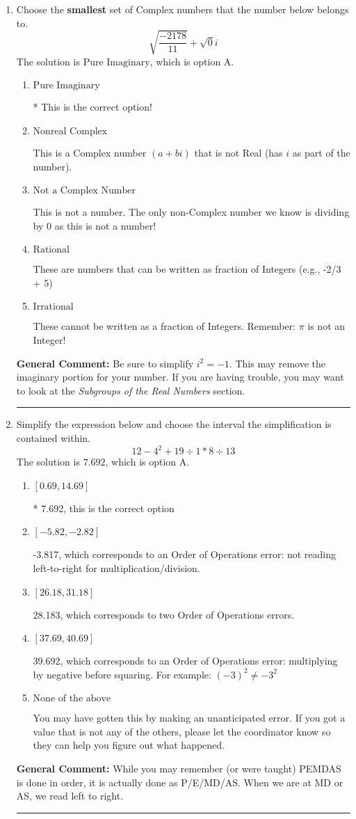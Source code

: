 \documentclass{extbook}[14pt]
\newcommand{\litem}[1]{\item #1

\rule{\textwidth}{0.4pt}}
\begin{document}
\begin{enumerate}
{ Irrational numbers are more than just square root of 3: adding or subtracting values from square root of 3 is also irrational.
}
\litem{
Choose the \textbf{smallest} set of Complex numbers that the number below belongs to.
\[ \sqrt{\frac{-2178}{11}}+\sqrt{0}i \]The solution is \( \text{Pure Imaginary} \), which is option A.\begin{enumerate}[label=\Alph*.]
\item \( \text{Pure Imaginary} \)

* This is the correct option!
\item \( \text{Nonreal Complex} \)

This is a Complex number $(a+bi)$ that is not Real (has $i$ as part of the number).
\item \( \text{Not a Complex Number} \)

This is not a number. The only non-Complex number we know is dividing by 0 as this is not a number!
\item \( \text{Rational} \)

These are numbers that can be written as fraction of Integers (e.g., -2/3 + 5)
\item \( \text{Irrational} \)

These cannot be written as a fraction of Integers. Remember: $\pi$ is not an Integer!
\end{enumerate}

\textbf{General Comment:} Be sure to simplify $i^2 = -1$. This may remove the imaginary portion for your number. If you are having trouble, you may want to look at the \textit{Subgroups of the Real Numbers} section.
}
\litem{
Simplify the expression below and choose the interval the simplification is contained within.
\[ 12 - 4^2 + 19 \div 1 * 8 \div 13 \]The solution is \( 7.692 \), which is option A.\begin{enumerate}[label=\Alph*.]
\item \( [0.69, 14.69] \)

* 7.692, this is the correct option
\item \( [-5.82, -2.82] \)

 -3.817, which corresponds to an Order of Operations error: not reading left-to-right for multiplication/division.
\item \( [26.18, 31.18] \)

 28.183, which corresponds to two Order of Operations errors.
\item \( [37.69, 40.69] \)

 39.692, which corresponds to an Order of Operations error: multiplying by negative before squaring. For example: $(-3)^2 \neq -3^2$
\item \( \text{None of the above} \)

 You may have gotten this by making an unanticipated error. If you got a value that is not any of the others, please let the coordinator know so they can help you figure out what happened.
\end{enumerate}

\textbf{General Comment:} While you may remember (or were taught) PEMDAS is done in order, it is actually done as P/E/MD/AS. When we are at MD or AS, we read left to right.
}
\end{enumerate}
\end{document}
